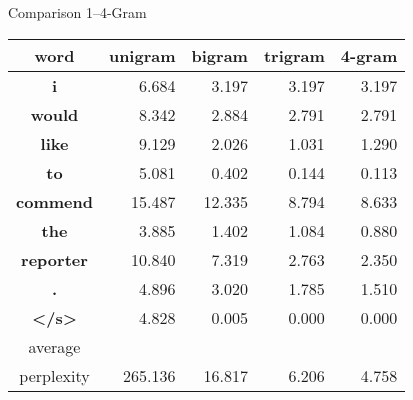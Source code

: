 \documentclass[compress]{beamer}
\begin{document}

\begin{frame}{Comparison 1--4-Gram}
\begin{center}
\begin{tabular}{c|r|r|r|r}
word & unigram & bigram & trigram & 4-gram \\ \hline \hline
{\bf i}           & 6.684 & 3.197 & 3.197 & 3.197\\ \hline
{\bf would}       & 8.342 & 2.884 & 2.791 & 2.791\\ \hline
{\bf like}        & 9.129 & 2.026 & 1.031 & 1.290\\ \hline
{\bf to}          & 5.081 & 0.402 & 0.144 & 0.113\\ \hline
{\bf commend}     &15.487 &12.335 & 8.794 & 8.633\\ \hline
{\bf the}         & 3.885 & 1.402 & 1.084 & 0.880\\ \hline
{\bf reporter }  &10.840 & 7.319 & 2.763 & 2.350\\ \hline
{\bf .}           & 4.896 & 3.020 & 1.785 & 1.510\\ \hline
{\bf \textless /s\textgreater}  & 4.828 & 0.005 & 0.000 & 0.000\\ \hline \hline
average          &   &  &   &  \\ \hline
perplexity       & 265.136 & 16.817 & 6.206 & 4.758\\
\end{tabular}
\end{center}

\end{frame}
\end{document}

